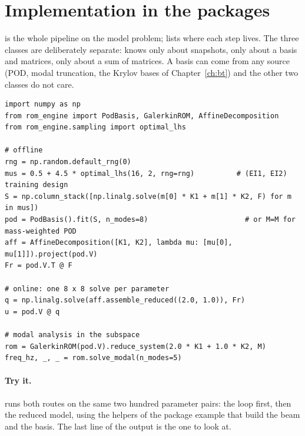 \section{Implementation in the packages}\label{sec:pod-impl}

 is the whole pipeline on the model problem;  lists where each step lives. The three classes are deliberately separate:  knows only about snapshots,  only about a basis and matrices,  only about a sum of matrices. A basis can come from any source (POD, modal truncation, the Krylov bases of Chapter~\ref{ch:bt}) and the other two classes do not care.

\begin{lstlisting}[caption={Offline--online pipeline on the two-region beam (matrices K1, K2 are the dense free-dof blocks; theta is the coefficient function).},label={lst:pod-run}]
import numpy as np
from rom_engine import PodBasis, GalerkinROM, AffineDecomposition
from rom_engine.sampling import optimal_lhs

# offline
rng = np.random.default_rng(0)
mus = 0.5 + 4.5 * optimal_lhs(16, 2, rng=rng)          # (EI1, EI2) training design
S = np.column_stack([np.linalg.solve(m[0] * K1 + m[1] * K2, F) for m in mus])
pod = PodBasis().fit(S, n_modes=8)                       # or M=M for mass-weighted POD
aff = AffineDecomposition([K1, K2], lambda mu: [mu[0], mu[1]]).project(pod.V)
Fr = pod.V.T @ F

# online: one 8 x 8 solve per parameter
q = np.linalg.solve(aff.assemble_reduced((2.0, 1.0)), Fr)
u = pod.V @ q

# modal analysis in the subspace
rom = GalerkinROM(pod.V).reduce_system(2.0 * K1 + 1.0 * K2, M)
freq_hz, _, _ = rom.solve_modal(n_modes=5)
\end{lstlisting}

\paragraph{Try it.}  runs both routes on the same two hundred parameter pairs: the loop first, then the reduced model, using the helpers of the package example that build the beam and the basis. The last line of the output is the one to look at.

